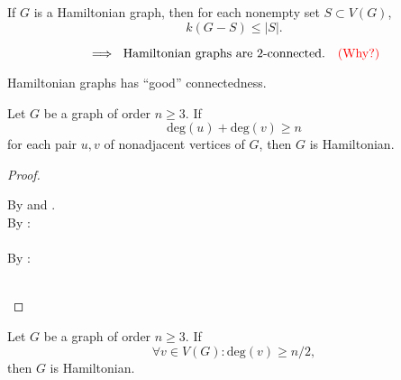 
\begin{frame}{}
  \begin{theorem}
    If $G$ is a Hamiltonian graph, then for each nonempty set $S \subset V(G)$,
    \[
      k(G - S) \le \big\lvert S \big\rvert.
    \]
  \end{theorem}

  \pause
  \[
    \implies \text{ Hamiltonian graphs are } 2\text{-connected.} \quad \textcolor{red}{(\text{Why?})}
  \]

  \pause
  \vspace{0.30cm}
  \begin{center}
    Hamiltonian graphs has ``good'' connectedness. \\[10pt] \pause
  \end{center}
\end{frame}

\begin{frame}{}
  \begin{theorem}
    Let $G$ be a graph of order $n \ge 3$. If
    \[
      \text{deg}(u) + \text{deg}(v) \ge n
    \]
    for each pair $u,v$ of nonadjacent vertices of $G$,
    then $G$ is Hamiltonian.
  \end{theorem}

  \pause
  \begin{proof}
    \begin{center}
      By  and . \\[10pt] \pause
      By : \\ [5pt]
       \\[8pt]
      By : \\[5pt]
       \\[8pt]
    \end{center}

  \end{proof}
\end{frame}

\begin{frame}{}
  \begin{theorem}
    Let $G$ be a graph of order $n \ge 3$. If
    \[
      \forall v \in V(G): \text{deg}(v) \ge n/2,
    \]
    then $G$ is Hamiltonian.
  \end{theorem}
\end{frame}


